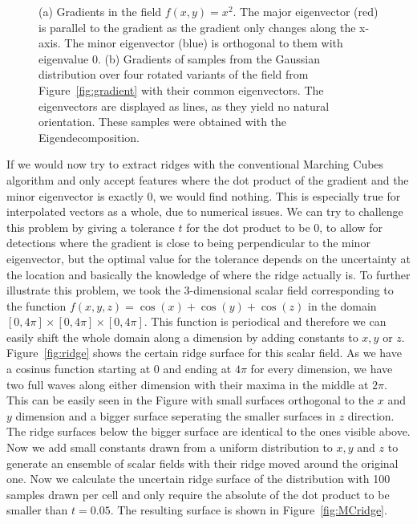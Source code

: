 \begin{figure}
\begin{subfigure}[b]{0.49\textwidth}
        \caption{}
        \label{fig:samples}
    \end{subfigure}
    \caption{(a) Gradients in the field $f(x,y)=x^2$. The major
    eigenvector (red) is parallel to the gradient as the gradient only
    changes along the x-axis. The minor eigenvector (blue) is orthogonal
    to them with eigenvalue 0. (b) Gradients of samples from the
    Gaussian distribution over four rotated variants of the field from
    Figure~\ref{fig:gradient} with their common eigenvectors. The
    eigenvectors are displayed as lines, as they yield no natural
    orientation. These samples were obtained with the
    Eigendecomposition.}
    \label{fig:sampComp}
\end{figure}
If we would now try to extract ridges with the conventional Marching
Cubes algorithm and only accept features where the dot product of the
gradient and the minor eigenvector is exactly 0, we would find nothing.
This is especially true for interpolated vectors as a whole, due to
numerical issues. We can try to challenge this problem by giving a
tolerance $t$ for the dot product to be 0, to allow for detections where
the gradient is close to being perpendicular to the minor eigenvector,
but the optimal value for the tolerance depends on the uncertainty at
the location and basically the knowledge of where the ridge actually is.
To further illustrate this problem, we took the 3-dimensional scalar
field corresponding to the function $f(x,y,z) = \cos{(x)} + \cos{(y)} +
\cos{(z)}$ in the domain $[0, 4 \pi] \times [0, 4\pi] \times [0, 4\pi]$.
This function is periodical and therefore we can easily shift the whole
domain along a dimension by adding constants to $x, y$ or $z$.
Figure~\ref{fig:ridge} shows the certain ridge surface for this scalar
field. As we have a cosinus function starting at 0 and ending at $4\pi$
for every dimension, we have two full waves along either dimension with
their maxima in the middle at $2\pi$. This can be easily seen in the
Figure with small surfaces orthogonal to the $x$ and $y$ dimension and a
bigger surface seperating the smaller surfaces in $z$ direction. The
ridge surfaces below the bigger surface are identical to the ones
visible above. Now we add small constants drawn from a uniform
distribution to $x, y$ and $z$ to generate an ensemble of scalar fields
with their ridge moved around the original one. Now we calculate the
uncertain ridge surface of the distribution with 100 samples drawn per
cell and only require the absolute of the dot product to be smaller than
$t=0.05$. The resulting surface is shown in Figure~\ref{fig:MCridge}.

